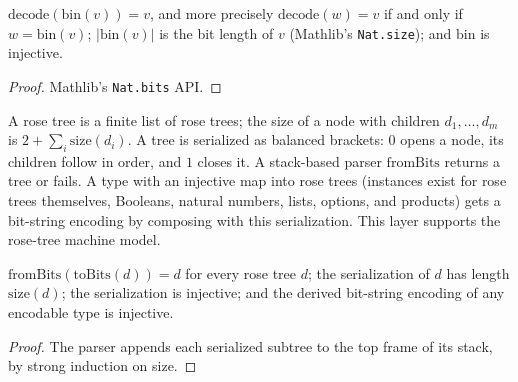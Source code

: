 \begin{lemma}
  \label{lem:encodings-binary-nat}
  \leanok
  $\mathrm{decode}(\mathrm{bin}(v)) = v$, and more precisely
  $\mathrm{decode}(w) = v$ if and only if $w = \mathrm{bin}(v)$;
  $|\mathrm{bin}(v)|$ is the bit length of $v$ (Mathlib's
  \texttt{Nat.size}); and $\mathrm{bin}$ is injective.
\end{lemma}
\begin{proof}
  \leanok
  Mathlib's \texttt{Nat.bits} API.
\end{proof}

\begin{definition}
  \label{def:encodings-data}
  \leanok
  A rose tree is a finite list of rose trees; the size of a node with
  children $d_1, \dots, d_m$ is $2 + \sum_i \mathrm{size}(d_i)$. A tree is
  serialized as balanced brackets: $0$ opens a node, its children follow in
  order, and $1$ closes it. A stack-based parser $\mathrm{fromBits}$ returns a
  tree or fails. A type with an injective map into rose trees (instances exist
  for rose trees themselves, Booleans, natural numbers, lists, options, and
  products) gets a bit-string encoding by composing with this serialization.
  This layer supports the rose-tree machine model.
\end{definition}

\begin{lemma}
  \label{lem:encodings-data}
  \leanok
  $\mathrm{fromBits}(\mathrm{toBits}(d)) = d$ for every rose tree $d$; the
  serialization of $d$ has length $\mathrm{size}(d)$; the serialization is
  injective; and the derived bit-string encoding of any encodable type is
  injective.
\end{lemma}
\begin{proof}
  \leanok
  The parser appends each serialized subtree to the top frame of its stack,
  by strong induction on size.
\end{proof}

